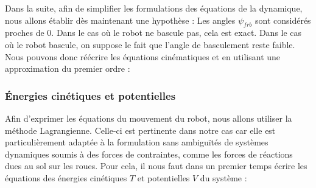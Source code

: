					Dans la suite, afin de simplifier les formulations des équations de la dynamique, nous allons établir dès maintenant une hypothèse : Les angles $\psi_{frb}$ sont considérés proches de $0$.
					Dans le cas où le robot ne bascule pas, cela est exact. Dans le cas où le robot bascule, on suppose le fait que l'angle de basculement reste faible.
					Nous pouvons donc réécrire les équations cinématiques  et  en utilisant une approximation du premier ordre :

			
			\subsubsection{Énergies cinétiques et potentielles}
			
				\label{section.contrainte_basculement}
				
					Afin d'exprimer les équations du mouvement du robot, nous allons utiliser la méthode Lagrangienne.
					Celle-ci est pertinente dans notre cas car elle est particulièrement adaptée à la formulation sans ambiguïtés de systèmes dynamiques soumis à des forces de contraintes, comme les forces de réactions dues au sol sur les roues. 
					Pour cela, il nous faut dans un premier temps écrire les équations des énergies cinétiques $T$ et potentielles $V$ du système :
					
